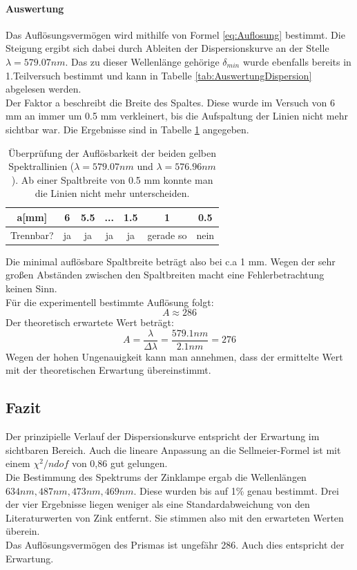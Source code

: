 \documentclass[12pt,a4paper]{article}
\begin{document}
\paragraph{Auswertung}
Das Auflösungsvermögen wird mithilfe von Formel \ref{eq:Auflosung} bestimmt.
Die Steigung ergibt sich dabei durch Ableiten der Dispersionskurve an der Stelle $\lambda = 579.07 nm$. Das zu dieser Wellenlänge gehörige $\delta_{min}$ wurde ebenfalls bereits in 1.Teilversuch bestimmt und kann in Tabelle \ref{tab:AuswertungDispersion} abgelesen werden. \\
Der Faktor a beschreibt die Breite des Spaltes. Diese wurde im Versuch von 6 mm an immer um 0.5 mm verkleinert, bis die Aufspaltung der Linien nicht mehr sichtbar war. Die Ergebnisse sind in Tabelle \ref{tab:Auflosung_Prisma} angegeben.
\begin{table}
\begin{tabular}{|c|c|c|c|c|c|c|}
\hline
a[mm] & 6 & 5.5 & ... & 1.5 & 1 & 0.5\\
\hline
Trennbar? & ja & ja & ja & ja & gerade so & nein\\
\hline
\end{tabular}
\caption{Überprüfung der Auflösbarkeit der beiden gelben Spektrallinien ($\lambda = 579.07nm$ und $\lambda = 576.96nm$). Ab einer Spaltbreite von 0.5 mm konnte man die Linien nicht mehr unterscheiden.}
\label{tab:Auflosung_Prisma}
\end{table}
Die minimal auflösbare Spaltbreite beträgt also bei c.a 1 mm.
Wegen der sehr großen Abständen zwischen den Spaltbreiten macht eine Fehlerbetrachtung keinen Sinn.\\
Für die experimentell bestimmte Auflösung folgt:
\begin{equation}
A \approx 286
\end{equation}
Der theoretisch erwartete Wert beträgt:
\begin{equation}
A = \dfrac{\lambda}{\Delta \lambda} = \dfrac{579.1 nm}{2.1 nm} = 276
\end{equation}
Wegen der hohen Ungenauigkeit kann man annehmen, dass der ermittelte Wert mit der theoretischen Erwartung übereinstimmt.
	
	
\subsection{Fazit}
Der prinzipielle Verlauf der Dispersionskurve entspricht der Erwartung im sichtbaren Bereich. Auch die lineare Anpassung an die Sellmeier-Formel ist mit einem $\chi^2/ndof$ von 0,86 gut gelungen.\\
Die Bestimmung des Spektrums der Zinklampe ergab die Wellenlängen $634nm, 487nm, 473 nm, 469nm $. Diese wurden bis auf 1\% genau bestimmt. Drei der vier Ergebnisse liegen weniger als eine Standardabweichung von den Literaturwerten von Zink entfernt. Sie stimmen also mit den erwarteten Werten überein.\\
Das Auflösungsvermögen des Prismas ist ungefähr 286. Auch dies entspricht der Erwartung.
	
\end{document}

